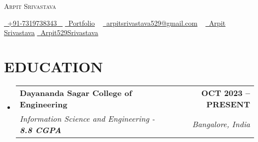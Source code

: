 \documentclass[letterpaper,11pt]{article}
\makeatletter
\newcommand{\resumeSubheading}[4]{
  \vspace{-2pt}\item
    \begin{tabular*}{1.0\textwidth}[t]{l@{\extracolsep{\fill}}r}
      \textbf{\large#1} & \textbf{\small #2} \\
      \textit{\large#3} & \textit{\small #4} \\
      
    \end{tabular*}\vspace{-7pt}
}
\newcommand{\resumeSubHeadingListStart}{\begin{itemize}[leftmargin=0.0in, label={}]}
\newcommand{\resumeSubHeadingListEnd}{\end{itemize}}
\makeatother
\begin{document}


\begin{center}
    {\Huge \scshape Arpit Srivastava} \\ \vspace{1pt}
   
    \small \href{tel:+xxxxxxxxxxxx}{ \raisebox{-0.1\height}\faPhone\ \underline{+91-7319738343} ~}
    \href{https://arpit529srivastava.tech/}{\raisebox{-0.1\height}\faGlobe\ \underline{Portfolio}} ~
    \hspace{8pt} %
    \href{mailto:arpitsrivastava529@gmail.com}{\raisebox{-0.2\height}\faEnvelope\  \underline{arpitsrivastava529@gmail.com}} ~ 
    \href{https://www.linkedin.com/in/arpitsrivastava529/}{\raisebox{-0.2\height}\faLinkedinSquare\ \underline{Arpit Srivastava}} 
    \hspace{10pt} %
    \href{https://github.com/arpit529srivastava}{\raisebox{-0.2\height}\faGithubSquare\ \underline{Arpit529Srivastava}}
\end{center}

\section{EDUCATION}
  \resumeSubHeadingListStart
    \resumeSubheading
      {Dayananda Sagar College of Engineering}{OCT 2023 -- PRESENT}
      {Information Science and Engineering -  \textbf{8.8 CGPA}}{Bangalore, India}
      \vspace{-7pt}
  \resumeSubHeadingListEnd

  


        
               
\end{document}
